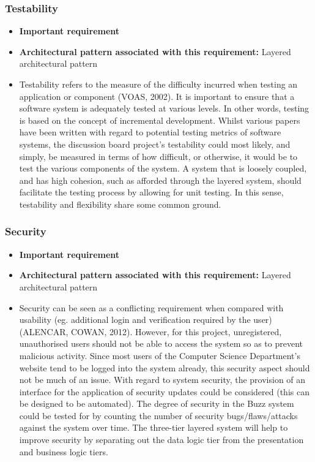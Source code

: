 \documentclass[a4paper]{article}
\begin{document}
\subsubsection{Testability}
\begin{itemize}
	\item \textbf{Important requirement}
	\item \textbf{Architectural pattern associated with this requirement:} Layered architectural pattern  
	\item Testability refers to the measure of the difficulty incurred when testing an application or component (VOAS, 2002). It is important to ensure that a software system is adequately tested at various levels. In other words, testing is based on the concept of incremental development. Whilst various papers have been written with regard to potential testing metrics of software systems, the discussion board project’s testability could most likely, and simply, be measured in terms of how difficult, or otherwise, it would be to test the various components of the system. A system that is loosely coupled, and has high cohesion, such as afforded through the layered system, should facilitate the testing process by allowing for unit testing. In this sense, testability and flexibility share some common ground.
\end{itemize}


\subsubsection{Security}
\begin{itemize}
	\item \textbf{Important requirement}
	\item \textbf{Architectural pattern associated with this requirement:} Layered architectural pattern 
	\item Security can be seen as a conflicting requirement when compared with usability (eg. additional login and verification required by the user) (ALENCAR, COWAN, 2012). However, for this project, unregistered, unauthorised users should not be able to access the system so as to prevent malicious activity. Since most users of the Computer Science Department’s website tend to be logged into the system already, this security aspect should not be much of an issue. With regard to system security, the provision of an interface for the application of security updates could be considered (this can be designed to be automated). The degree of security in the Buzz system could be tested for by counting the number of security bugs/flaws/attacks against the system over time. The three-tier layered system will help to improve security by separating out the data logic tier from the presentation and business logic tiers.
\end{itemize}
\end{document}
